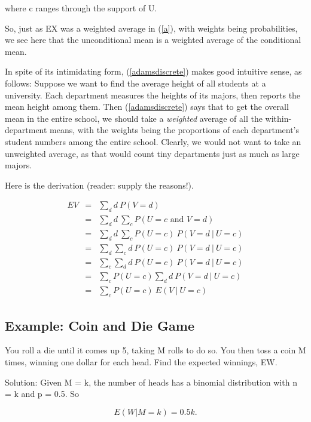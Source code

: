 where c ranges through the support of U.

So, just as EX was a weighted average in (\ref{a}), with weights being
probabilities, we see here that the unconditional mean is a weighted
average of the conditional mean.

In spite of its intimidating form, (\ref{adamsdiscrete}) makes good
intuitive sense, as follows:  Suppose we want to find the average height
of all students at a university.  Each department measures the heights
of its majors, then reports the mean height among them.  Then
(\ref{adamsdiscrete}) says that to get the overall mean in the entire
school, we should take a {\it weighted} average of all the
within-department means, with the weights being the proportions of each
department's student numbers among the entire school.  Clearly, we would
not want to take an unweighted average, as that would count tiny
departments just as much as large majors.

Here is the derivation (reader:  supply the reasons!).

\begin{eqnarray}
EV &=& \sum_{d} d ~ P(V = d) \\ 
   &=& \sum_{d} d ~ \sum_{c} P(U = c \textrm{ and } V = d) \\ 
   &=& \sum_{d} d ~ \sum_{c} P(U = c) ~ P(V = d ~|~ U = c) \\ 
   &=& \sum_{d} \sum_{c} d ~P(U = c) ~ P(V = d ~|~ U = c) \\ 
   &=& \sum_{c} \sum_{d} d ~P(U = c) ~ P(V = d ~|~ U = c) \\ 
   &=& \sum_{c} P(U = c) \sum_{d} d ~ P(V = d ~|~ U = c) \\ 
   &=& \sum_c P(U = c) ~ E(V ~|~ U = c) 
\end{eqnarray}

\subsection{Example:  Coin and Die Game}

You roll a die until it comes up 5, taking M rolls to do so.  You then
toss a coin M times, winning one dollar for each head.  Find the
expected winnings, EW.

Solution:  Given M = k, the number of heads has a binomial distribution
with n = k and p = 0.5.  So

\begin{equation}
E(W | M = k) = 0.5 k.
\end{equation}

